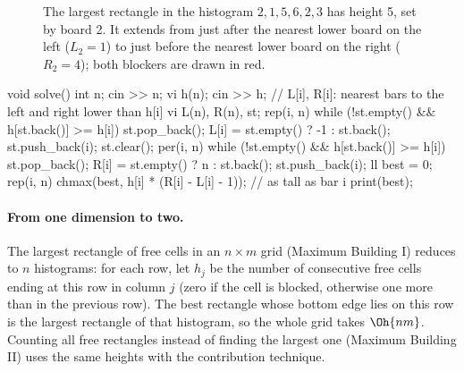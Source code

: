 \begin{figure}[htbp]
\centering
{}
\caption{The largest rectangle in the histogram $2, 1, 5, 6, 2, 3$ has height 5, set by board 2. It extends from just after
the nearest lower board on the left ($L_2 = 1$) to just before the nearest lower board on the right ($R_2 = 4$); both
blockers are drawn in red.}
\label{fig:histogram}
\end{figure}

\begin{code}
void solve() {
    int n;
    cin >> n;
    vi h(n);
    cin >> h;
    // L[i], R[i]: nearest bars to the left and right lower than h[i]
    vi L(n), R(n), st;
    rep(i, n) {
        while (!st.empty() && h[st.back()] >= h[i]) st.pop_back();
        L[i] = st.empty() ? -1 : st.back();
        st.push_back(i);
    }
    st.clear();
    per(i, n) {
        while (!st.empty() && h[st.back()] >= h[i]) st.pop_back();
        R[i] = st.empty() ? n : st.back();
        st.push_back(i);
    }
    ll best = 0;
    rep(i, n) chmax(best, h[i] * (R[i] - L[i] - 1));  // as tall as bar i
    print(best);
}
\end{code}


\paragraph{From one dimension to two.} The largest rectangle of free cells in an $n \times m$ grid (Maximum Building I)
reduces to $n$ histograms: for each row, let $h_j$ be the number of consecutive free cells ending at this row in column $j$
(zero if the cell is blocked, otherwise one more than in the previous row). The best rectangle whose bottom edge lies on this
row is the largest rectangle of that histogram, so the whole grid takes $\Oh{nm}$. Counting all free rectangles instead of
finding the largest one (Maximum Building II) uses the same heights with the contribution technique.

